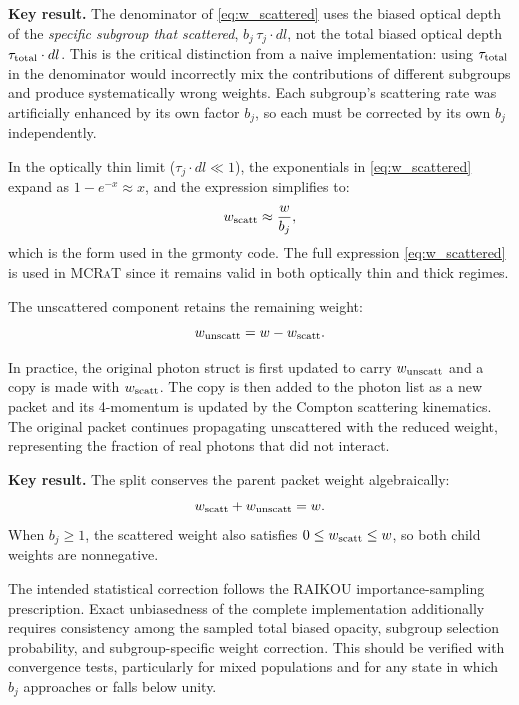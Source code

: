 \documentclass[12pt,a4paper]{article}
\newcommand{\mcrat}{\textsc{MCRaT}}
\newenvironment{keyresult}{%
	\begin{framed}\noindent\textbf{Key result.}\quad}
	{\end{framed}}
\begin{document}
\begin{keyresult}
	The denominator of \eqref{eq:w_scattered} uses the biased optical depth
	of the \emph{specific subgroup that scattered}, $b_j\,\tau_j \cdot dl$,
	not the total biased optical depth $\tau_{\rm total} \cdot dl$.  This is
	the critical distinction from a naive implementation: using
	$\tau_{\rm total}$ in the denominator would incorrectly mix the
	contributions of different subgroups and produce systematically wrong
	weights.  Each subgroup's scattering rate was artificially enhanced by
	its own factor $b_j$, so each must be corrected by its own $b_j$
	independently.
\end{keyresult}

In the optically thin limit ($\tau_j \cdot dl \ll 1$), the exponentials
in \eqref{eq:w_scattered} expand as $1 - e^{-x} \approx x$, and the
expression simplifies to:
\begin{equation}
	w_{\rm scatt} \approx \frac{w}{b_j},
	\label{eq:w_scattered_thin}
\end{equation}
which is the form used in the \citet{dolence2009} grmonty code.  The
full expression \eqref{eq:w_scattered} is used in \mcrat{} since it
remains valid in both optically thin and thick regimes.

The unscattered component retains the remaining weight:
\begin{equation}
	w_{\rm unscatt} = w - w_{\rm scatt}.
	\label{eq:w_unscattered}
\end{equation}

In practice, the original photon struct is first updated to carry
$w_{\rm unscatt}$ and a copy is made with $w_{\rm scatt}$.  The copy
is then added to the photon list as a new packet and its 4-momentum is
updated by the Compton scattering kinematics.  The original packet
continues propagating unscattered with the reduced weight, representing
the fraction of real photons that did not interact.

\begin{keyresult}
	The split conserves the parent packet weight algebraically:
	\begin{equation}
		w_{\rm scatt}+w_{\rm unscatt}=w.
	\end{equation}
	When $b_j\ge1$, the scattered weight also satisfies
	$0\le w_{\rm scatt}\le w$, so both child weights are nonnegative.
	
	The intended statistical correction follows the RAIKOU importance-sampling
	prescription. Exact unbiasedness of the complete implementation additionally
	requires consistency among the sampled total biased opacity, subgroup
	selection probability, and subgroup-specific weight correction. This should
	be verified with convergence tests, particularly for mixed populations and
	for any state in which $b_j$ approaches or falls below unity.
\end{keyresult}
\end{document}
